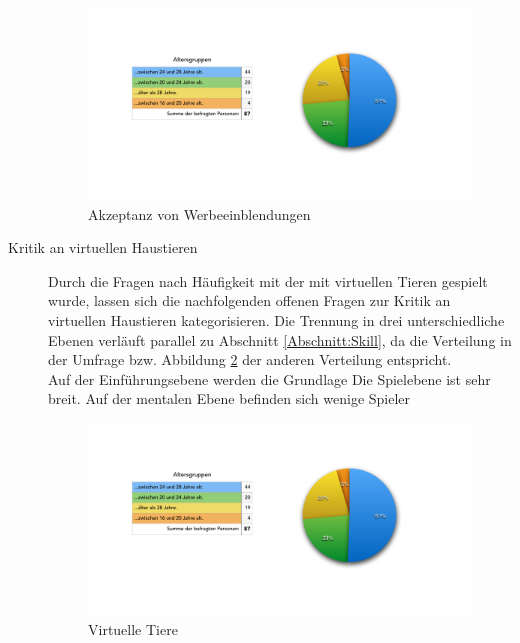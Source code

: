 \begin{description}
\begin{figure}[H]
    \centering
    \includegraphics[trim=40 75 30 70,clip,width=1.2\textwidth, page=10]{files/statistik/umfrage1Ergebnisse.pdf}
    \caption{Akzeptanz von Werbeeinblendungen}
    \label{chart:werbung}
\end{figure}


\item[Kritik an virtuellen Haustieren] Durch die Fragen nach Häufigkeit mit der mit virtuellen Tieren gespielt wurde, lassen sich die nachfolgenden offenen Fragen zur Kritik an virtuellen Haustieren kategorisieren. Die Trennung in drei unterschiedliche Ebenen verläuft parallel zu Abschnitt \ref{Abschnitt:Skill}, da die Verteilung in der Umfrage bzw. Abbildung \ref{chart:virtuelleTiereKritikasdf} der anderen Verteilung entspricht.\\
Auf der Einführungsebene werden die Grundlage
Die Spielebene ist sehr breit. 
Auf der mentalen Ebene befinden sich wenige Spieler

\begin{figure}[H]
    \centering
    \includegraphics[trim=40 75 30 70,clip,width=1.2\textwidth, page=8]{files/statistik/umfrage1Ergebnisse.pdf}
    \caption{Virtuelle Tiere}
    \label{chart:virtuelleTiereKritikasdf}
\end{figure}



\end{description}
